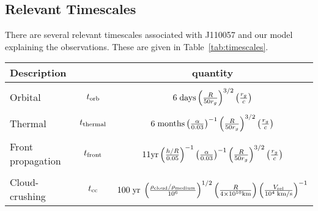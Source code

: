 \documentclass[11pt,a4paper]{article}
\begin{document}
\subsection*{Relevant Timescales}
There are several relevant timescales associated with J110057 and our
model explaining the observations. These are given in
Table~\ref{tab:timescales}.
\begin{table}
  \centering
  \begin{tabular}{ l c c }
\hline \hline
    Description           &                             & quantity \\
\hline  
&& \\
Orbital                      & $t_{\rm orb}$          &  $6\; {\rm days}
                                                                     \left( \frac{R}{50 r_{g}}  \right)^{3/2}
                                                                    \left( \frac{ r_{g}}{c} \right)$\\
&& \\
Thermal                    &  $t_{\rm thermal}$    &  $6 \; {\rm months} 
                                                                        \left( \frac{\alpha}{0.03}  \right)^{-1}
                                                                        \left( \frac{R}{50 r_{g}}  \right)^{3/2}
                                                                       \left(  \frac{ r_{g}}{c}\right)  $ \\
&& \\
Front propagation   & $t_{\rm front}$             & $11 {\rm yr}
                                                                         \left( \frac{h/R}{0.05}  \right)^{-1}
                                                                         \left( \frac{\alpha}{0.03}  \right)^{-1}
                                                                        \left( \frac{R}{50 r_{g}}  \right)^{3/2}
                                                                     \left( \frac{ r_{g}}{c}\right)$\\
&& \\
 Cloud-crushing      &  $t_{\rm cc}$             &   $100\; {\rm yr} \; 
                                                                       \left(  \frac{  \rho_{\rm cloud}/\rho_{\rm medium}}{10^6}  \right )^{1/2} 
                                                                       \left( \frac{R}{4\times10^{10} \rm{km}} \right)
                                                                     \left(\frac{V_{\rm rel}}{10^4 {\rm \; km/s }} \right)^{-1} $\\

\end{tabular}
\end{table}
\end{document}
